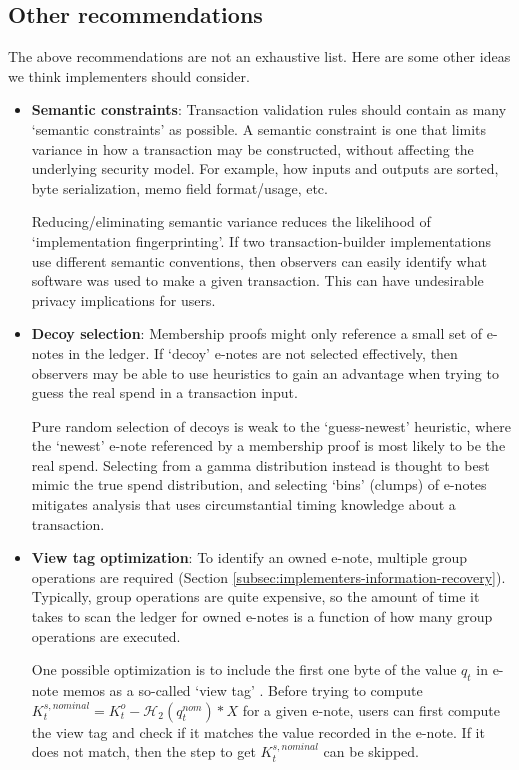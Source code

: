 \subsection{Other recommendations}
\label{subsec:implementers-other-recommendations}

The above recommendations are not an exhaustive list. Here are some other ideas we think implementers should consider.

\begin{itemize}
    \item \textbf{Semantic constraints}: Transaction validation rules should contain as many `semantic constraints' as possible. A semantic constraint is one that limits variance in how a transaction may be constructed, without affecting the underlying security model. For example, how inputs and outputs are sorted, byte serialization, memo field format/usage, etc.

    Reducing/eliminating semantic variance reduces the likelihood of `implementation fingerprinting'. If two transaction-builder implementations use different semantic conventions, then observers can easily identify what software was used to make a given transaction. This can have undesirable privacy implications for users.

    \item \textbf{Decoy selection}: Membership proofs might only reference a small set of e-notes in the ledger. If `decoy' e-notes are not selected effectively, then observers may be able to use heuristics to gain an advantage when trying to guess the real spend in a transaction input.

    Pure random selection of decoys is weak to the `guess-newest' heuristic, where the `newest' e-note referenced by a membership proof is most likely to be the real spend. Selecting from a gamma distribution instead is thought to best mimic the true spend distribution, and selecting `bins' (clumps) of e-notes mitigates analysis that uses circumstantial timing knowledge about a transaction. \cite{AnalysisOfLinkability}

    \item \textbf{View tag optimization}: To identify an owned e-note, multiple group operations are required (Section \ref{subsec:implementers-information-recovery}). Typically, group operations are quite expensive, so the amount of time it takes to scan the ledger for owned e-notes is a function of how many group operations are executed.

    One possible optimization is to include the first one byte of the value $q_t$ in e-note memos as a so-called `view tag' \cite{reduce-scan-times-view-tag-research-issue-73}. Before trying to compute $K^{s,nominal}_t = K^o_t - \mathcal{H}_2(q^{nom}_t)*X$ for a given e-note, users can first compute the view tag and check if it matches the value recorded in the e-note. If it does not match, then the step to get $K^{s,nominal}_t$ can be skipped.
\end{itemize}



